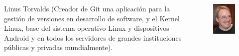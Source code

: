 \documentclass[aspectratio=169]{beamer}
\begin{document}
\begin{frame}
\begin{columns}
\begin{column}{0.5\textwidth}
Linus Torvalds (Creador de Git una aplicación para la gestión de versiones en desarrollo de software, y el Kernel Linux, base del sistema operativo Linux y dispositivos Android y en todos los servidores de grandes instituciones públicas y privadas mundialmente).\\
\end{column}
\begin{column}{0.5\textwidth}
\begin{figure}
\includegraphics[width=.5\textwidth]{Linus.jpeg}
\end{figure}   
\end{column}
\end{columns}
\end{frame}
\end{document}
